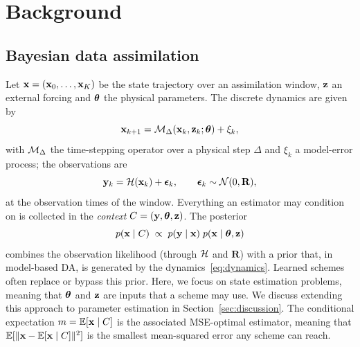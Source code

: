\section{Background}\label{sec:chain}

\subsection{Bayesian data assimilation}
Let $\mathbf{x} = (\mathbf{x}_0, \dots, \mathbf{x}_K)$ be the state trajectory over an assimilation
window, $\mathbf{z}$ an external forcing and $\boldsymbol{\theta}$ the physical parameters. The
discrete dynamics are given by
\begin{equation}\label{eq:dynamics}
  \mathbf{x}_{k+1} = \mathcal{M}_\Delta(\mathbf{x}_k, \mathbf{z}_k; \boldsymbol{\theta}) + \xi_k ,
\end{equation}
with $\mathcal{M}_\Delta$ the time-stepping operator over a physical step $\Delta$ and
$\xi_k$ a model-error process; the observations are
\begin{equation}\label{eq:obs}
  \mathbf{y}_k = \mathcal{H}(\mathbf{x}_k) + \boldsymbol{\epsilon}_k, \qquad \boldsymbol{\epsilon}_k \sim \mathcal{N}(0, \mathbf{R}),
\end{equation}
at the observation times of the window. Everything an estimator may condition on
is collected in the \emph{context} $C = (\mathbf{y}, \boldsymbol{\theta}, \mathbf{z})$. The posterior
\begin{equation}\label{eq:posterior}
  p(\mathbf{x} \mid C) \;\propto\; p(\mathbf{y} \mid \mathbf{x})\; p(\mathbf{x} \mid \boldsymbol{\theta}, \mathbf{z})
\end{equation}
combines the observation likelihood (through $\mathcal{H}$ and $\mathbf{R}$) with a prior that, in model-based DA, is generated by the dynamics~\eqref{eq:dynamics}.
Learned schemes often replace or bypass this prior. Here, we focus on 
state estimation problems, meaning that $\boldsymbol{\theta}$ and $\mathbf{z}$ are inputs that a scheme may use. We discuss extending this approach to parameter estimation in Section~\ref{sec:discussion}. The conditional expectation $m = \mathbb{E}[\mathbf{x} \mid C]$ is the associated MSE-optimal estimator, meaning that $\mathbb{E}[\|\mathbf{x} - \mathbb{E}[\mathbf{x} \mid C] \|^2]$ is the smallest mean-squared error any scheme can reach.

